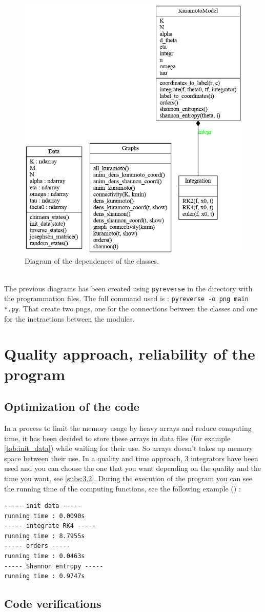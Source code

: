 \documentclass[1pt, a4paper]{article}
\begin{document}
\begin{figure}[htbp]
    \centering
    \includegraphics[scale=0.4]{figures/classes_kuramotoModel.png}
    \caption{Diagram of the dependences of the classes.}
    \label{fig:diagram_classes}
\end{figure}\\
The previous diagrams has been created using \texttt{pyreverse} in the directory with the programmation files. The full command used is : \texttt{pyreverse -o png main *.py}. That create two pngs, one for the connections between the classes and one for the inetractions between the modules.
\newpage
\noindent
\section{Quality approach, reliability of the program}
\label{sec:4}
\subsection{Optimization of the code}
\label{subs:4.1}
In a process to limit the memory usage by heavy arrays and reduce computing time, it has been decided to store these arrays in data files (for example \autoref{tab:init_data}) while waiting for their use. So arrays doesn't takes up memory space between their use. In a quality and time approach, 3 integrators have been used and you can choose the one that you want depending on the quality and the time you want, see \autoref{subs:3.2}. During the execution of the program you can see the running time of the computing functions, see the following example () :
\begin{verbatim}
----- init data -----
running time : 0.0090s
----- integrate RK4 -----
running time : 8.7955s
----- orders -----
running time : 0.0463s
----- Shannon entropy -----
running time : 0.9747s
\end{verbatim}
\subsection{Code verifications}
\label{subs:4.2}


\newpage


\end{document}

